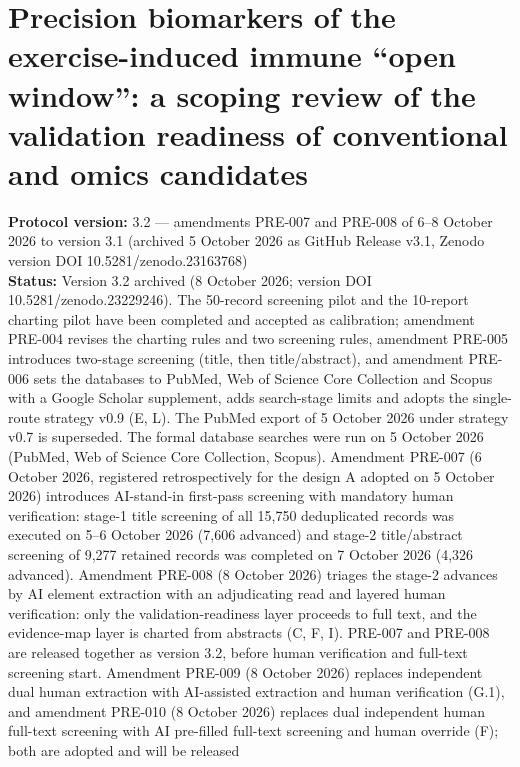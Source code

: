\documentclass[
  11pt,
  a4paper,
]{article}
\author{}
\date{}
\begin{document}
\section{Precision biomarkers of the exercise-induced immune ``open
window'': a scoping review of the validation readiness of conventional
and omics
candidates}\label{precision-biomarkers-of-the-exercise-induced-immune-open-window-a-scoping-review-of-the-validation-readiness-of-conventional-and-omics-candidates}

\textbf{Protocol version:} 3.2 --- amendments PRE-007 and PRE-008 of
6--8 October 2026 to version 3.1 (archived 5 October 2026 as GitHub
Release v3.1, Zenodo version DOI 10.5281/zenodo.23163768)\\
\textbf{Status:} Version 3.2 archived (8 October 2026; version DOI
10.5281/zenodo.23229246). The 50-record screening pilot and the
10-report charting pilot have been completed and accepted as
calibration; amendment PRE-004 revises the charting rules and two
screening rules, amendment PRE-005 introduces two-stage screening
(title, then title/abstract), and amendment PRE-006 sets the databases
to PubMed, Web of Science Core Collection and Scopus with a Google
Scholar supplement, adds search-stage limits and adopts the single-route
strategy v0.9 (E, L). The PubMed export of 5 October 2026 under strategy
v0.7 is superseded. The formal database searches were run on 5 October
2026 (PubMed, Web of Science Core Collection, Scopus). Amendment PRE-007
(6 October 2026, registered retrospectively for the design A adopted on
5 October 2026) introduces AI-stand-in first-pass screening with
mandatory human verification: stage-1 title screening of all 15,750
deduplicated records was executed on 5--6 October 2026 (7,606 advanced)
and stage-2 title/abstract screening of 9,277 retained records was
completed on 7 October 2026 (4,326 advanced). Amendment PRE-008 (8
October 2026) triages the stage-2 advances by AI element extraction with
an adjudicating read and layered human verification: only the
validation-readiness layer proceeds to full text, and the evidence-map
layer is charted from abstracts (C, F, I). PRE-007 and PRE-008 are
released together as version 3.2, before human verification and
full-text screening start. Amendment PRE-009 (8 October 2026) replaces
independent dual human extraction with AI-assisted extraction and human
verification (G.1), and amendment PRE-010 (8 October 2026) replaces dual
independent human full-text screening with AI pre-filled full-text
screening and human override (F); both are adopted and will be released
\end{document}
